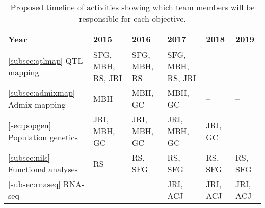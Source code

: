 
\begin{table}[]
\label{tab:timeline}
\begin{center}
\begin{tabular}{p{3.5cm}p{2cm}p{2cm}p{2cm}p{2cm}p{2cm}}\\\toprule  
{\bf Year} & {\bf 2015} & {\bf 2016} & {\bf 2017} & {\bf 2018} & {\bf 2019} \\\midrule
\ref{subsec:qtlmap} \hspace{3cm} QTL mapping 			& SFG, MBH, RS, JRI 	& SFG, MBH, RS 	& SFG, MBH, RS, JRI 	& -- 			& -- \\\midrule
\ref{subsec:admixmap} \hspace{3cm} Admix mapping		& MBH 				& MBH, GC 		& MBH, GC 			& -- 			& -- \\\midrule
\ref{sec:popgen} \hspace{3cm} Population genetics		& JRI, MBH, GC 		& JRI, MBH, GC  	& JRI, MBH, GC		& JRI, GC 	& -- \\\midrule
\ref{subsec:nils} \hspace{2cm} Functional \mbox{analyses} 		& RS 				& RS, SFG		& RS, SFG 			& RS, SFG 	& RS, SFG  \\\midrule
\ref{subsec:rnaseq} \hspace{2cm} RNA-seq 				& --  					& --  				& JRI, ACJ  			& JRI, ACJ	& JRI, ACJ \\\bottomrule
\end{tabular}
\caption{Proposed timeline of activities showing which team members will be responsible for each objective.}\label{tab:timeline}

\end{center}
\end{table} 


